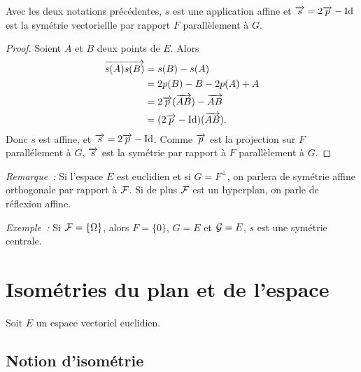 \begin{prop}
  Avec les deux notations précédentes, $s$ est une application affine et $\overrightarrow{s} = 2\overrightarrow{p}-\operatorname{Id}$ est la symétrie vectoriellle par rapport $F$ parallèlement à $G$.
\end{prop}
\begin{proof}
  Soient $A$ et $B$ deux points de $E$. Alors
  \begin{align}
    \overrightarrow{s(A)s(B)} &= s(B)-s(A) \\
     &= 2p(B)-B-2p(A)+A \\
     &= 2\overrightarrow{p}(\overrightarrow{AB}) - \overrightarrow{AB} \\
     &= (2\overrightarrow{p}-\operatorname{Id})(\overrightarrow{AB}).
  \end{align}
   Donc $s$ est affine, et $\overrightarrow{s}=2\overrightarrow{p}-\operatorname{Id}$. Comme $\overrightarrow{p}$ est la projection sur $F$ parallélement à $G$, $\overrightarrow{s}$ est la symétrie par rapport à $F$ parallèlement à $G$.
\end{proof}

\emph{Remarque~:} Si l'espace $E$ est euclidien et si $G=F^\perp$, on parlera de symétrie affine orthogonale par rapport à $\mathcal{F}$. Si de plus $\mathcal{F}$ est un hyperplan, on parle de réflexion affine.

\emph{Exemple~:} Si $\mathcal{F}=\{\Omega\}$, alors $F=\{0\}$, $G=E$ et $\mathcal{G}=E$, $s$ est une symétrie centrale.

\section{Isométries du plan et de l'espace}

Soit $E$ un espace vectoriel euclidien.

\subsection{Notion d'isométrie}

